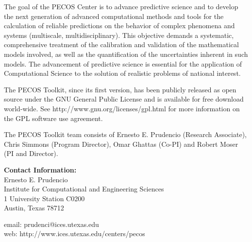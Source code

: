 The goal of the PECOS Center is
to advance predictive science and to develop the next generation of advanced computational methods and tools
for the calculation of reliable predictions on the behavior of complex phenomena and systems (multiscale, multidisciplinary).
This objective demands a systematic, comprehensive treatment of the calibration and validation of the mathematical models involved,
as well as the quantification of the uncertainties inherent in such models.
The advancement of predictive science is essential for the application of Computational Science to the solution of realistic problems of national interest.

The PECOS Toolkit, since its first version, has been publicly released as open source
under the GNU General Public License and is available for free download world-wide.
See http://www.gnu.org/licenses/gpl.html for more information on the GPL software use agreement.

The PECOS Toolkit team consists of
Ernesto E. Prudencio (Research Associate),
Chris Simmons (Program Director),
Omar Ghattas (Co-PI) and
Robert Moser (PI and Director).

{\bf Contact Information:}\\
Ernesto E. Prudencio\\
Institute for Computational and Engineering Sciences\\
1 University Station C0200\\
Austin, Texas 78712

email: prudenci@ices.utexas.edu\\
web: http://www.ices.utexas.edu/centers/pecos

\clearpage
$~$\\
